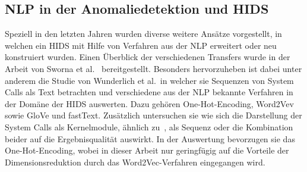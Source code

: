         

    \subsection{NLP in der Anomaliedetektion und HIDS}

        Speziell in den letzten Jahren wurden diverse weitere Ansätze vorgestellt, in welchen ein \ac{HIDS} mit Hilfe von Verfahren aus der \ac{NLP} erweitert oder neu konstruiert wurden.
        Einen Überblick der verschiedenen Transfers wurde in der Arbeit von Sworna et al.~\cite{NLPHIDSSWORNA2022} bereitgestellt.
        Besonders hervorzuheben ist dabei unter anderem die Studie von Wunderlich et al.\ in welcher sie Sequenzen von System Calls als Text betrachten und verschiedene aus der \ac{NLP} bekannte Verfahren in der Domäne der \ac{HIDS} auswerten.
        Dazu gehören One-Hot-Encoding, Word2Vev sowie GloVe und fastText. 
        Zusätzlich untersuchen sie wie sich die Darstellung der System Calls als Kernelmodule, ähnlich zu~\cite{SYSTEM_STATES}, als Sequenz oder die Kombination beider auf die Ergebnisqualität auswirkt.
        In der Auswertung bevorzugen sie das One-Hot-Encoding, wobei in dieser Arbeit nur geringfügig auf die Vorteile der Dimensionsreduktion durch das Word2Vec-Verfahren eingegangen wird.\cite{W2VWUNDERLICH2019}

